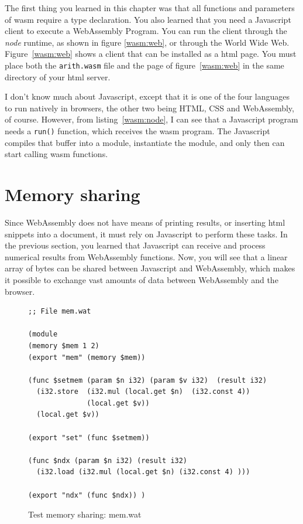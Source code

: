 \documentclass[a4paper,12pt]{book}
\begin{document}
The first thing you learned in this
chapter was that all functions and parameters
of wasm require a type declaration. You also 
learned that you need a Javascript client
to execute a WebAssembly Program. You can run
the client through the {\em node} runtime, as
shown in figure \ref{wasm:web}, or through the
World Wide Web. Figure~\ref{wasm:web} shows
a client that can be installed as a html page.
You must place both the \verb|arith.wasm| file
and the page of figure~\ref{wasm:web} in the same
directory of your html server.

I don't know much about Javascript, except that
it is one of the four languages to run natively
in browsers, the other two being HTML, CSS and
WebAssembly, of course. However, from
listing~\ref{wasm:node}, I can see that
a Javascript program needs a \verb|run()|
function, which receives the wasm program.
The Javascript compiles that buffer into a module,
instantiate the module, and only then can start
calling wasm functions.


\section{Memory sharing}
Since WebAssembly does not have means of printing results,
or inserting html snippets into a document, it must rely
on Javascript to perform these tasks. In the previous section,
you learned that Javascript can receive and process
numerical results from WebAssembly functions. Now, you will
see that a linear array of bytes can be shared between
Javascript and WebAssembly, which makes it possible
to exchange vast amounts of data between WebAssembly
and the browser.

\begin{figure}[!h]
\begin{verbatim}
;; File mem.wat

(module
(memory $mem 1 2)
(export "mem" (memory $mem))

(func $setmem (param $n i32) (param $v i32)  (result i32)
  (i32.store  (i32.mul (local.get $n)  (i32.const 4))
              (local.get $v))
  (local.get $v))
  
(export "set" (func $setmem))

(func $ndx (param $n i32) (result i32)
  (i32.load (i32.mul (local.get $n) (i32.const 4) )))
  
(export "ndx" (func $ndx)) )
\end{verbatim}
  \caption{Test memory sharing: mem.wat}
  \label{wasm:memsharing}
\end{figure}
\end{document}
